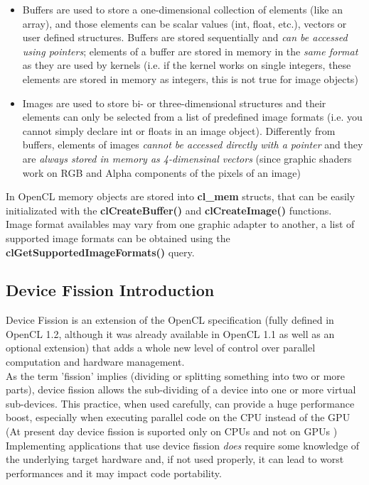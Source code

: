 \begin{itemize}
	\item Buffers are used to store a one-dimensional collection of elements (like an array), and those elements can be scalar values (int, float, etc.), vectors or user defined structures.
	Buffers are stored sequentially and \emph{can be accessed using pointers}; elements of a buffer are stored in memory in the \emph{same format} as they are used by kernels (i.e. if the kernel works on single integers, these elements are stored in memory as integers, this is not true for image objects)
	\item Images are used to store bi- or three-dimensional structures and their elements can only be selected from a list of predefined image formats (i.e. you cannot simply declare int or floats in an image object). Differently from buffers, elements of images \emph{cannot be accessed directly with a pointer} and they are \emph{always stored in memory as 4-dimensinal vectors} (since graphic shaders work on RGB and Alpha components of the pixels of an image)
\end{itemize}

\begin{CLCode}
In OpenCL memory objects are stored into \textbf{cl\_mem} structs, that can be easily initializated with the \textbf{clCreateBuffer()} and \textbf{clCreateImage()} functions.\\
Image format availables may vary from one graphic adapter to another, a list of supported image formats can be obtained using the \textbf{clGetSupportedImageFormats()} query.
\end{CLCode}



\vfill
\columnbreak
\subsection{Device Fission Introduction}

Device Fission is an extension of the OpenCL specification (fully defined in OpenCL 1.2, although it was already available in OpenCL 1.1 as well as an optional extension) that adds a whole new level of control over parallel computation and hardware management.\\
As the term 'fission' implies (dividing or splitting something into two or more parts), device fission allows the sub-dividing of a device into one or more virtual sub-devices. This practice, when used carefully, can provide a huge performance boost, especially when executing parallel code on the CPU instead of the GPU \cite{intel:12:DeviceFission} (At present day device fission is suported only on CPUs and not on GPUs \cite{gaster:11:DeviceFission})
Implementing applications that use device fission \emph{does} require some knowledge of the underlying target hardware and, if not used properly, it can lead to worst performances and it may impact code portability.

